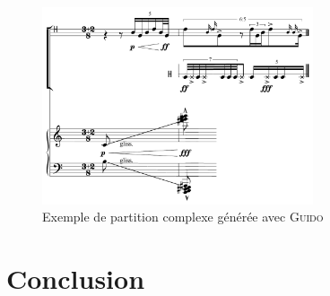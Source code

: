 \documentclass{article}
\newcommand{\guido}			{\textsc{Guido}}
\begin{document}
\begin{figure}[h]
\centering
\includegraphics[width=80mm]{img/partitions/complexExemple.pdf}
\caption{Exemple de partition complexe générée avec \guido}
\label{fig:complexExemple}
\end{figure}


\section{Conclusion}\label{sec:conclusion}




\end{document}
